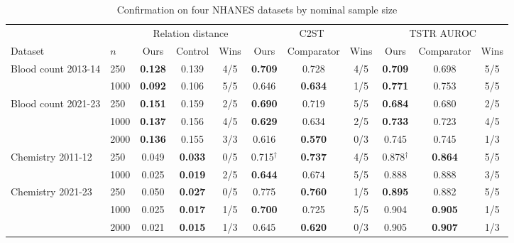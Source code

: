 \documentclass[pdflatex,referee]{sn-jnl}%
\begin{document}
\begin{table}[htbp]
\caption{Confirmation on four NHANES datasets by nominal sample size}
\label{tab:robust}
\centering
\footnotesize
\setlength{\tabcolsep}{2.2pt}
\begin{tabular}{llccccccccc}
\toprule
& & \multicolumn{3}{c}{Relation distance} & \multicolumn{3}{c}{C2ST} & \multicolumn{3}{c}{TSTR AUROC} \\
Dataset & $n$ & Ours & Control & Wins & Ours & Comparator & Wins & Ours & Comparator & Wins \\
\midrule
Blood count 2013-14 & 250 & \textbf{0.128} & 0.139 & 4/5 & \textbf{0.709} & 0.728 & 4/5 & \textbf{0.709} & 0.698 & 5/5 \\
 & 1000 & \textbf{0.092} & 0.106 & 5/5 & 0.646 & \textbf{0.634} & 1/5 & \textbf{0.771} & 0.753 & 5/5 \\
Blood count 2021-23 & 250 & \textbf{0.151} & 0.159 & 2/5 & \textbf{0.690} & 0.719 & 5/5 & \textbf{0.684} & 0.680 & 2/5 \\
 & 1000 & \textbf{0.137} & 0.156 & 4/5 & \textbf{0.629} & 0.634 & 2/5 & \textbf{0.733} & 0.723 & 4/5 \\
 & 2000 & \textbf{0.136} & 0.155 & 3/3 & 0.616 & \textbf{0.570} & 0/3 & 0.745 & 0.745 & 1/3 \\
Chemistry 2011-12 & 250 & 0.049 & \textbf{0.033} & 0/5 & 0.715$^{\dagger}$ & \textbf{0.737} & 4/5 & 0.878$^{\dagger}$ & \textbf{0.864} & 5/5 \\
 & 1000 & 0.025 & \textbf{0.019} & 2/5 & \textbf{0.644} & 0.674 & 5/5 & 0.888 & 0.888 & 3/5 \\
Chemistry 2021-23 & 250 & 0.050 & \textbf{0.027} & 0/5 & 0.775 & \textbf{0.760} & 1/5 & \textbf{0.895} & 0.882 & 5/5 \\
 & 1000 & 0.025 & \textbf{0.017} & 1/5 & \textbf{0.700} & 0.725 & 5/5 & 0.904 & \textbf{0.905} & 1/5 \\
 & 2000 & 0.021 & \textbf{0.015} & 1/3 & 0.645 & \textbf{0.620} & 0/3 & 0.905 & \textbf{0.907} & 1/3 \\
\bottomrule
\end{tabular}
\end{table}
\end{document}
